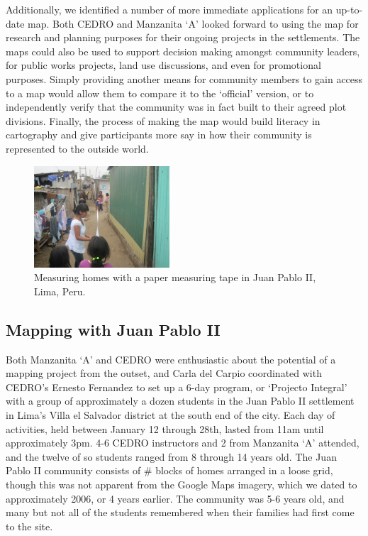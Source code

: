 \documentclass[11pt]{report}
\begin{document}
Additionally, we identified a number of more immediate applications for an up-to-date map. Both CEDRO and Manzanita `A' looked forward to using the map for research and planning purposes for their ongoing projects in the settlements. The maps could also be used to support decision making amongst community leaders, for public works projects, land use discussions, and even for promotional purposes. Simply providing another means for community members to gain access to a map would allow them to compare it to the `official' version, or to independently verify that the community was in fact built to their agreed plot divisions. Finally, the process of making the map would build literacy in cartography and give participants more say in how their community is represented to the outside world.  

\begin{figure}
	\begin{flushright}
		\includegraphics[width=0.45\textwidth]{images/juan-pablo-measuring.jpg}
		\caption{Measuring homes with a paper measuring tape in Juan Pablo II, Lima, Peru.}
	\end{flushright}
\end{figure}

\subsection{Mapping with Juan Pablo II}

Both Manzanita `A' and CEDRO were enthusiastic about the potential of a mapping project from the outset, and Carla del Carpio coordinated with CEDRO's Ernesto Fernandez to set up a 6-day program, or `Projecto Integral' with a group of approximately a dozen students in the Juan Pablo II settlement in Lima's Villa el Salvador district at the south end of the city. Each day of activities, held between January 12 through 28th, lasted from 11am until approximately 3pm. 4-6 CEDRO instructors and 2 from Manzanita `A' attended, and the twelve of so students ranged from 8 through 14 years old. The Juan Pablo II community consists of \# blocks of homes arranged in a loose grid, though this was not apparent from the Google Maps imagery, which we dated to approximately 2006, or 4 years earlier. The community was 5-6 years old, and many but not all of the students remembered when their families had first come to the site. 
\end{document}

